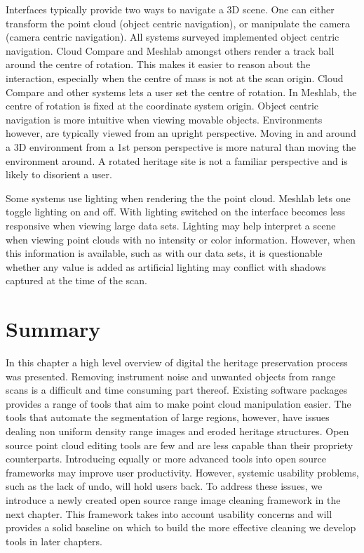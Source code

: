 Interfaces typically provide two ways to navigate a 3D scene. One can either transform the point cloud (object centric navigation), or manipulate the camera (camera centric navigation). All systems surveyed implemented object centric navigation. Cloud Compare and Meshlab amongst others render a track ball around the centre of rotation. This makes it easier to reason about the interaction, especially when the centre of mass is not at the scan origin. Cloud Compare and other systems lets a user set the centre of rotation. In Meshlab, the centre of rotation is fixed at the coordinate system origin. Object centric navigation is more intuitive when viewing movable objects. Environments however, are typically viewed from an upright perspective. Moving in and around a 3D environment from a 1st person perspective is more natural than moving the environment around. A rotated heritage site is not a familiar perspective and is likely to disorient a user.

Some systems use lighting when rendering the the point cloud. Meshlab lets one toggle lighting on and off. With lighting switched on the interface becomes less responsive when viewing large data sets. Lighting may help interpret a scene when viewing point clouds with no intensity or color information. However, when this information is available, such as with our data sets, it is questionable whether any value is added as artificial lighting may conflict with shadows captured at the time of the scan.


\section{Summary}
In this chapter a high level overview of digital the heritage preservation process was presented. Removing instrument noise and unwanted objects from range scans is a difficult and time consuming part thereof. Existing software packages provides a range of tools that aim to make point cloud manipulation easier. The tools that automate the segmentation of large regions, however, have issues dealing non uniform density range images and eroded heritage structures. Open source point cloud editing tools are few and are less capable than their propriety counterparts. Introducing equally or more advanced tools into open source frameworks may improve user productivity. However, systemic usability problems, such as the lack of undo, will hold users back. To address these issues, we introduce a newly created open source range image cleaning framework in the next chapter. This framework takes into account usability concerns and will provides a solid baseline on which to build the more effective cleaning we develop tools in later chapters.


